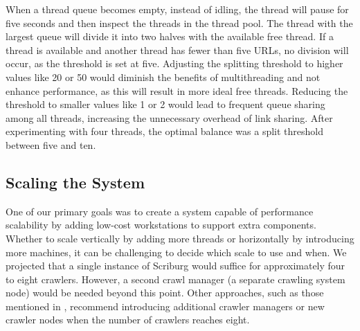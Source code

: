 When a thread queue becomes empty, instead of idling, the thread will pause for five seconds and then inspect the threads in the thread pool. The thread with the largest queue will divide it into two halves with the available free thread. If a thread is available and another thread has fewer than five URLs, no division will occur, as the threshold is set at five. Adjusting the splitting threshold to higher values like 20 or 50 would diminish the benefits of multithreading and not enhance performance, as this will result in more ideal free threads. Reducing the threshold to smaller values like 1 or 2 would lead to frequent queue sharing among all threads, increasing the unnecessary overhead of link sharing. After experimenting with four threads, the optimal balance was a split threshold between five and ten.

\subsection{Scaling the System}
One of our primary goals was to create a system capable of performance scalability by adding low-cost workstations to support extra components. Whether to scale vertically by adding more threads or horizontally by introducing more machines, it can be challenging to decide which scale to use and when. We projected that a single instance of Scriburg would suffice for approximately four to eight crawlers. However, a second crawl manager (a separate crawling system node) would be needed beyond this point. Other approaches, such as those mentioned in \cite{shkapenyuk2002design}, recommend introducing additional crawler managers or new crawler nodes when the number of crawlers reaches eight.


